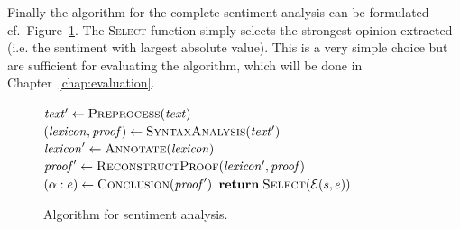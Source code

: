 Finally the algorithm for the complete sentiment analysis can be formulated cf.\ Figure~\ref{algorithm}. The \textsc{Select} function simply selects the strongest opinion extracted (i.e. the sentiment with largest absolute value). This is a very simple choice but are sufficient for evaluating the algorithm, which will be done in Chapter~\ref{chap:evaluation}. %
\begin{figure}[ht]
\begin{cframed}{.9\textwidth}
\vspace{-1em}
\begin{codebox}
\zi $\mathit{text'} \leftarrow \textnormal{\scshape Preprocess}(\mathit{text})$
\zi $(\mathit{lexicon}, \mathit{proof}) \leftarrow \textnormal{\scshape SyntaxAnalysis}(\mathit{text}')$
\zi $\mathit{lexicon}' \leftarrow \textnormal{\scshape Annotate}(\mathit{lexicon})$
\zi $\mathit{proof}' \leftarrow \textnormal{\scshape ReconstructProof}(\mathit{lexicon'}, \mathit{proof})$
\zi $(\alpha : e) \leftarrow \textnormal{\scshape Conclusion}(\mathit{proof}')$
\zi $\textbf{return} \; \textnormal{\scshape Select}(\mathcal{E}(s, e))$
\End
\end{codebox}
\end{cframed}
\caption{Algorithm for sentiment analysis.}
\label{algorithm}
\end{figure}


